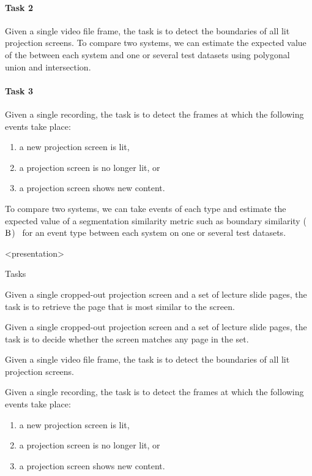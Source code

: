 \paragraph{Task 2} Given a single video file frame, the task is to detect the
boundaries of all lit projection screens. To compare two systems, we can
estimate the expected value of the  between each system and
one or several test datasets using polygonal union and intersection.

\paragraph{Task 3} Given a single recording, the task is to detect the frames
at which the following events take place:
\begin{enumerate}
  \item a new projection screen is lit,
  \item a projection screen is no longer lit, or
  \item a projection screen shows new content.
\end{enumerate}
To compare two systems, we can take events of each type and estimate the
expected value of a segmentation similarity metric such as boundary similarity
($\textrm B$)~\cite{P13-1167} for an event type between each system on one or
several test datasets.

\mode
<presentation>

\begin{frame}{Tasks}
\begin{description}[<+->]
  \item[Task 1a]
    Given a single cropped-out projection screen and a set of lecture slide
    pages, the task is to retrieve the page that is most similar to the screen.

  \item[Task 1b]
    Given a single cropped-out projection screen and a set of lecture slide
    pages, the task is to decide whether the screen matches any page in the set.

  \item[Task 2]
    Given a single video file frame, the task is to detect the boundaries of all
    lit projection screens.

  \item[Task 3]
    Given a single recording, the task is to detect the frames at which the
    following events take place:
    \begin{enumerate}
      \item a new projection screen is lit,
      \item a projection screen is no longer lit, or
      \item a projection screen shows new content.
    \end{enumerate}
\end{description}
\end{frame}

